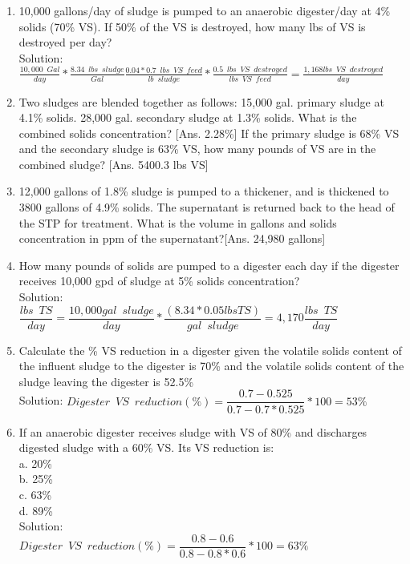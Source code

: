 \begin{enumerate}
\item 10,000 gallons/day of sludge is pumped to an anaerobic digester/day at 4\% solids (70\% VS).  If 50\% of the VS is destroyed, how many lbs of VS is destroyed per day?\\
Solution:\\
$\frac{10,000 \enspace Gal}{day}*\frac{8.34 \enspace lbs \enspace sludge}{Gal} \frac{0.04*0.7 \enspace lbs \enspace VS \enspace feed}{lb \enspace sludge}*\frac{0.5 \enspace lbs \enspace VS \enspace destroyed}{lbs \enspace VS \enspace feed}=\boxed{\frac{1,168lbs \enspace VS \enspace destroyed}{day} } $


\item Two sludges are blended together as follows: 15,000 gal. primary sludge at 4.1\% solids. 28,000 gal. secondary sludge at 1.3\% solids. What is the combined solids concentration? [Ans. 2.28\%] If the primary sludge is 68\% VS and the secondary sludge is 63\% VS, how many pounds of VS are in the combined sludge? [Ans. 5400.3 lbs VS]


\item 12,000 gallons of 1.8\% sludge is pumped to a thickener, and is thickened to 3800 gallons of 4.9\% solids. The supernatant is returned back to the head of the STP for treatment.  What is the volume in gallons and solids concentration in ppm of the supernatant?[Ans. 24,980 gallons]


\item How many pounds of solids are pumped to a digester each day if the digester receives 10,000 gpd of sludge at 5\% solids concentration?\\


 

Solution:\\

{
$
	\dfrac{lbs \enspace TS}{day}
	=
	\dfrac{10,000 gal \enspace sludge}{day}
	*
	\dfrac{(8.34*0.05 lbs TS )}{gal \enspace sludge}
	=4,170
	\dfrac{lbs \enspace TS}{day}
$
}\\


\item Calculate the \% VS reduction in a digester given the volatile solids content of the influent sludge to the digester is 70\% and the volatile solids content of the sludge leaving the digester is 52.5\%\\
Solution:  $Digester \enspace VS \enspace reduction (\%)=\dfrac{0.7-0.525}{0.7-0.7*0.525}*100=\boxed{ 53\%}$\\

\item If an anaerobic digester receives sludge with VS of 80\% and discharges digested sludge with a 60\% VS. Its VS reduction is:\\
a. 20\% \\
b. 25\% \\
c. 63\% \\
d. 89\% \\
\vspace{0.25cm}
Solution:\\
\vspace{0.25cm}
$Digester \enspace VS \enspace reduction (\%)=\dfrac{0.8-0.6}{0.8-0.8*0.6}*100=\boxed{ 63\%}$\\


\end{enumerate}
